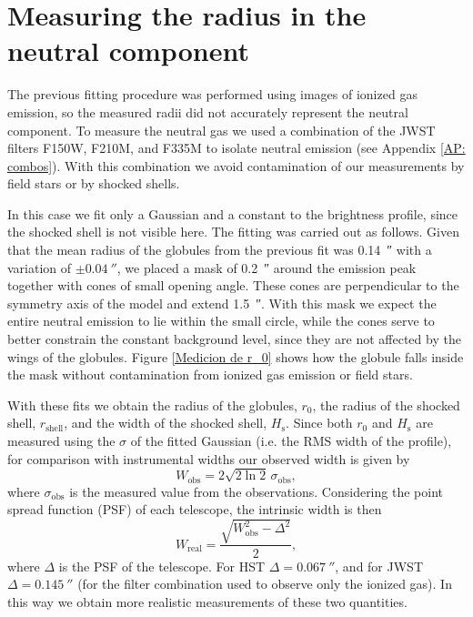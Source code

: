 \documentclass{book}
\begin{document}
\section{Measuring the radius in the neutral component} 
\label{Sec : radio neutro}

The previous fitting procedure was performed using images of ionized
gas emission, so the measured radii did not accurately represent the
neutral component. To measure the neutral gas we used a combination of
the JWST filters F150W, F210M, and F335M to isolate neutral emission
(see Appendix \ref{AP: combos}). With this combination we avoid
contamination of our measurements by field stars or by shocked shells.

In this case we fit only a Gaussian and a constant to the brightness
profile, since the shocked shell is not visible here. The fitting was
carried out as follows. Given that the mean radius of the globules
from the previous fit was \SI{0.14}{\arcsecond} with a variation of
$\pm\SI{0.04}{\arcsecond}$, we placed a mask of
\SI{0.2}{\arcsecond} around the emission peak together with cones of
small opening angle. These cones are perpendicular to the symmetry
axis of the model and extend \SI{1.5}{\arcsecond}. With this mask we
expect the entire neutral emission to lie within the small circle,
while the cones serve to better constrain the constant background
level, since they are not affected by the wings of the globules.
Figure \ref{Medicion de r_0} shows how the globule falls inside the
mask without contamination from ionized gas emission or field stars.

With these fits we obtain the radius of the globules, $r_0$, the
radius of the shocked shell, $r_\mathrm{shell}$, and the width of the
shocked shell, $H_\mathrm{s}$. Since both $r_0$ and $H_\mathrm{s}$ are
measured using the $\sigma$ of the fitted Gaussian (i.e. the RMS width
of the profile), for comparison with instrumental widths our observed
width is given by
\begin{equation}
    W_\mathrm{obs}= 2\sqrt{2\ln{2}} \, \sigma_\mathrm{obs},
\end{equation}
where $\sigma_\mathrm{obs}$ is the measured value from the
observations. Considering the point spread function (PSF) of each
telescope, the intrinsic width is then
\begin{equation}
    W_\mathrm{real} = \frac{\sqrt{W_\mathrm{obs}^2-\Delta^2}}{2},
\end{equation}
where $\Delta$ is the PSF of the telescope. For HST
$\Delta=\SI{0.067}{\arcsecond}$, and for JWST
$\Delta=\SI{0.145}{\arcsecond}$ (for the filter combination used to
observe only the ionized gas). In this way we obtain more realistic
measurements of these two quantities.
\end{document}
